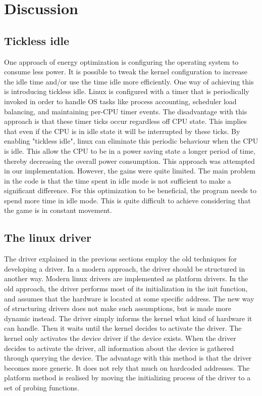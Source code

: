 \section{Discussion}

\subsection{Tickless idle}
One approach of energy optimization is configuring the operating system to consume less power. It is possible to tweak the kernel configuration to increase the idle time and/or use the time idle more efficiently. One way of achieving this is introducing tickless idle. Linux is configured with a timer that is periodically invoked in order to handle OS tasks like process accounting, scheduler load balancing, and maintaining per-CPU timer events. The disadvantage with this approach is that these timer ticks occur regardless off CPU state. This implies that even if the CPU is in idle state it will be interrupted by these ticks. By enabling "tickless idle", linux can eliminate this periodic behaviour when the CPU is idle. This allow the CPU to be in a power saving state a longer period of time, thereby decreasing the overall power consumption\cite{tick}. This approach was attempted in our implementation. However, the gains were quite limited. The main problem in the code is that the time spent in idle mode is not sufficient to make a significant difference. For this optimization to be beneficial, the program needs to spend more time in idle mode. This is quite difficult to achieve considering that the game is in constant movement. 

\subsection{The linux driver}
The driver explained in the previous sections employ the old techniques for developing a driver. In a modern approach, the driver should be structured in another way. Modern linux drivers are implemented as platform drivers. In the old approach, the driver performs most of its initialization in the init function, and assumes that the hardware is located at some specific address. The new way of structuring drivers does not make such assumptions, but is made more dynamic instead. The driver simply informs the kernel what kind of hardware it can handle. Then it waits until the kernel decides to activate the driver. The kernel only activates the device driver if the device exists. When the driver decides to activate the driver, all information about the device is gathered through querying the device. The advantage with this method is that the driver becomes more generic. It does not rely that much on hardcoded addresses. The platform method is realised by moving the initializing process of the driver to a set of probing functions. 

